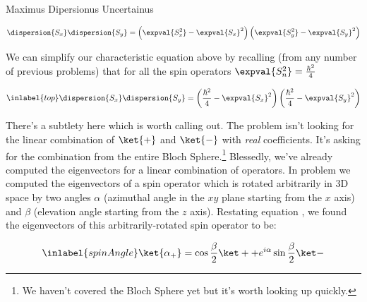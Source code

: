 \begin{answer}

  \begin{answerpart}{Maximus Dipersionus Uncertainus}

    \begin{equation}
      \begin{split}
        \dispersion{S_x}\dispersion{S_y}
        &=
        \left(\expval{S_x^2} - \expval{S_x}^2\right)
        \left(\expval{S_y^2} - \expval{S_y}^2\right)
        \\
      \end{split}
    \end{equation}

    We can simplify our characteristic equation above by recalling
    (from any number of previous problems) that for all the spin
    operators $\expval{S_n^2} = \frac{\hbar^2}{4}$
    
    \begin{equation}
      \inlabel{top}
      \begin{split}
        \dispersion{S_x}\dispersion{S_y}
        &=
        \left(\frac{\hbar^2}{4} - \expval{S_x}^2\right)
        \left(\frac{\hbar^2}{4} - \expval{S_y}^2\right)
        \\
      \end{split}
    \end{equation}

    There's a subtlety here which is worth calling out.  The problem
    isn't looking for the linear combination of $\ket{+}$ and
    $\ket{-}$ with \emph{real} coefficients.  It's asking for the
    combination from the entire Bloch Sphere.\footnote{We haven't
    covered the Bloch Sphere yet but it's worth looking up quickly.}
    Blessedly, we've already computed the eigenvectors for a linear
    combination of operators.  In problem  we
    computed the eigenvectors of a spin operator which is rotated
    arbitrarily in 3D space by two angles $\alpha$ (azimuthal angle in
    the $xy$ plane starting from the $x$ axis) and $\beta$ (elevation
    angle starting from the $z$ axis).  Restating equation
    , we found the eigenvectors of this
    arbitrarily-rotated spin operator to be:

    \begin{equation}
      \inlabel{spinAngle}
      \ket{\alpha_+} =
      \cos{\frac{\beta}{2}} \ket + + e^{i\alpha}\sin{\frac{\beta}{2}} \ket -
    \end{equation}


\end{answerpart}
\end{answer}

